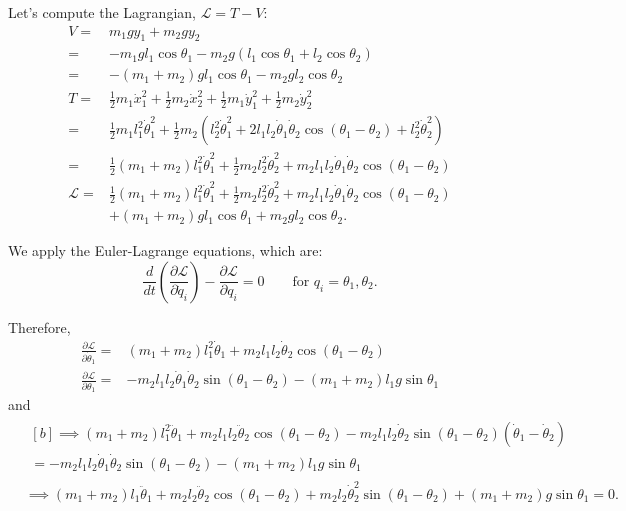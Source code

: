 \documentclass[11pt, leqno]{article}
\begin{document}
Let's compute the Lagrangian, $\mathcal{L} = T - V$:
\begin{align*}
	V ={}& m_1g y_1 + m_2gy_2 \\
	={}& -m_1gl_1\cos\theta_1 - m_2g(l_1\cos\theta_1 + l_2\cos\theta_2) \\
	={}& -(m_1+m_2)gl_1\cos\theta_1-m_2gl_2\cos\theta_2 \\
	T ={}& \frac{1}{2}m_1\dot x_1^2 + \frac{1}{2}m_2\dot x_2^2 + \frac{1}{2}m_1\dot y_1^2 + \frac{1}{2}m_2\dot y_2^2\\
	={}& \frac{1}{2}m_1l_1^2\dot \theta_1^2 + \frac{1}{2}m_2(l_2^2\dot\theta_1^2 + 2l_1l_2\dot\theta_1\dot\theta_2 \cos(\theta_1-\theta_2) + l_2^2\dot\theta_2^2) \\
	={}& \frac{1}{2}(m_1 + m_2)l_1^2\dot \theta_1^2 + \frac{1}{2}m_2l_2^2\dot\theta_2^2 + m_2l_1l_2\dot\theta_1\dot\theta_2\cos(\theta_1-\theta_2) \\
	\mathcal{L} ={}&   \frac{1}{2}(m_1 + m_2)l_1^2\dot \theta_1^2 + \frac{1}{2}m_2l_2^2\dot\theta_2^2 + m_2l_1l_2\dot\theta_1\dot\theta_2\cos(\theta_1-\theta_2) \\
		       &+(m_1+m_2)gl_1\cos\theta_1+m_2gl_2\cos\theta_2
.\end{align*}

We apply the Euler-Lagrange equations, which are:
\begin{equation*}
	\frac{d}{dt}\left( \frac{\partial \mathcal{L}}{\partial \dot q_i} \right)  - \frac{\partial \mathcal{L}}{\partial q_i} = 0\qquad \text{for } q_i = \theta_1, \theta_2 
.\end{equation*}

Therefore,
\begin{align*}
	\frac{\partial \mathcal{L}}{\partial \dot \theta_1} ={}& (m_1 + m_2) l_1^2 \dot \theta_1 + m_2l_1l_2\dot\theta_2\cos(\theta_1 - \theta_2)\\
	\frac{\partial \mathcal{L}}{\partial \theta_1} ={}& -m_2l_1l_2\dot \theta_1\dot \theta_2 \sin(\theta_1-\theta_2) -(m_1+m_2)l_1g \sin\theta_1
\end{align*}
and
\begin{align*}
	&
	\!\begin{multlined}[b]
	 \implies(m_1+m_2)l_1^2\ddot \theta_1 + m_2l_1l_2\ddot \theta_2\cos(\theta_1-\theta_2) - m_2l_1l_2\dot \theta_2\sin(\theta_1-\theta_2)(\dot \theta_1-\dot \theta_2) \\
	= -m_2l_1l_2\dot \theta_1\dot \theta_2\sin(\theta_1-\theta_2) - (m_1+m_2)l_1g\sin\theta_1
	\end{multlined}\\
	&\implies
	(m_1+m_2)l_1\ddot \theta_1 + m_2l_2\ddot \theta_2\cos(\theta_1-\theta_2) + m_2l_2\dot \theta_2^2 \sin(\theta_1-\theta_2) + (m_1+m_2)g\sin\theta_1 = 0
.\end{align*}
\end{document}
